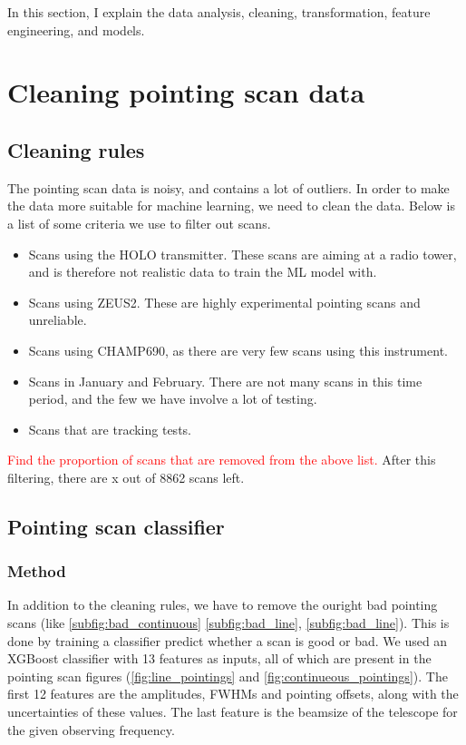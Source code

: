 In this section, I explain the data analysis, cleaning, transformation, feature engineering, and models.

\section{Cleaning pointing scan data}
\subsection{Cleaning rules}
The pointing scan data is noisy, and contains a lot of outliers. In order to make the data more suitable for machine learning, we need to clean the data.
Below is a list of some criteria we use to filter out scans.
\begin{itemize}
    \item Scans using the HOLO transmitter. These scans are aiming at a radio tower, and is therefore not realistic data to train the ML model with.
    \item Scans using ZEUS2. These are highly experimental pointing scans and unreliable.
    \item Scans using CHAMP690, as there are very few scans using this instrument.
    \item Scans in January and February. There are not many scans in this time period, and the few we have involve a lot of testing.
    \item Scans that are tracking tests.
\end{itemize}   
\textcolor{red}{Find the proportion of scans that are removed from the above list.}
After this filtering, there are x out of 8862 scans left.
        
\subsection{Pointing scan classifier}
\subsubsection{Method}
In addition to the cleaning rules, we have to remove the ouright bad pointing scans (like \ref{subfig:bad_continuous} \ref{subfig:bad_line}, \ref{subfig:bad_line}).
This is done by training a classifier predict whether a scan is good or bad.
We used an XGBoost classifier with 13 features as inputs, all of which are present in the pointing scan figures (\ref{fig:line_pointings} and \ref{fig:continueous_pointings}).
The first 12 features are the amplitudes, FWHMs and pointing offsets, along with the uncertainties of these values.
The last feature is the beamsize of the telescope for the given observing frequency.\\

